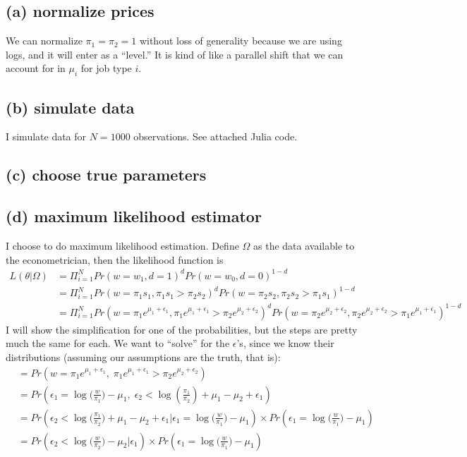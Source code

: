 \documentclass[12pt]{article}
\begin{document}
\subsection*{(a) normalize prices}
We can normalize $\pi_1 = \pi_2 = 1$ without loss of generality because we are using logs, and it will enter as a ``level.'' It is kind of like a parallel shift that we can account for in $\mu_i$ for job type $i$.  

\subsection*{(b) simulate data}
I simulate data for $N=1000$ observations. See attached Julia code. 

\subsection*{(c) choose true parameters}


\subsection*{(d) maximum likelihood estimator}
I choose to do maximum likelihood estimation. Define $\Omega$ as the data available to the econometrician, then the likelihood function is 
\begin{align*}
    L(\theta | \Omega ) & = \Pi_{i = 1}^N Pr(w = w_1, d = 1)^d Pr(w = w_0, d = 0)^{1-d}
    \\
    & = \Pi_{i = 1}^N Pr(w = \pi_1 s_1, \pi_1 s_1 > \pi_2 s_2)^d 
                      Pr(w = \pi_2 s_2, \pi_2 s_2 > \pi_1 s_1)^{1-d}
    \\
    & = \Pi_{i = 1}^N Pr(w = \pi_1 e^{\mu_1 + \epsilon_1}, \pi_1 e^{\mu_1 + \epsilon_1} > \pi_2 e^{\mu_2 + \epsilon_2})^d 
                      Pr(w = \pi_2 e^{\mu_2 + \epsilon_2}, \pi_2 e^{\mu_2 + \epsilon_2} > \pi_1 e^{\mu_1 + \epsilon_1})^{1-d}
\end{align*}
I will show the simplification for one of the probabilities, but the steps are pretty much the same for each. We want to ``solve'' for the $\epsilon$'s, since we know their distributions (assuming our assumptions are the truth, that is):
\begin{align*}
    & = Pr(w = \pi_1 e^{\mu_1 + \epsilon_1},\; \pi_1 e^{\mu_1 + \epsilon_1} > \pi_2 e^{\mu_2 + \epsilon_2})
    \\
    & = Pr(\epsilon_1 = \log\big(\frac{w}{\pi_1}\big)-\mu_1,\; 
        \epsilon_2 < \log(\frac{\pi_1}{\pi_2}) +\mu_1 -\mu_2+\epsilon_1 )
    \\
    & = Pr(\epsilon_2 < \log\big(\frac{\pi_1}{\pi_2}\big) +\mu_1 -\mu_2+\epsilon_1 | \epsilon_1 = \log\big(\frac{w}{\pi_1}\big)-\mu_1) \times
        Pr(\epsilon_1 = \log\big(\frac{w}{\pi_1}\big)-\mu_1)
    \\
    & = Pr(\epsilon_2 < \log\big( \frac{w}{\pi_2} \big) - \mu_2 | \epsilon_1 ) 
        \times Pr(\epsilon_1 = \log\big(\frac{w}{\pi_1}\big)-\mu_1)
\end{align*}
\end{document}
